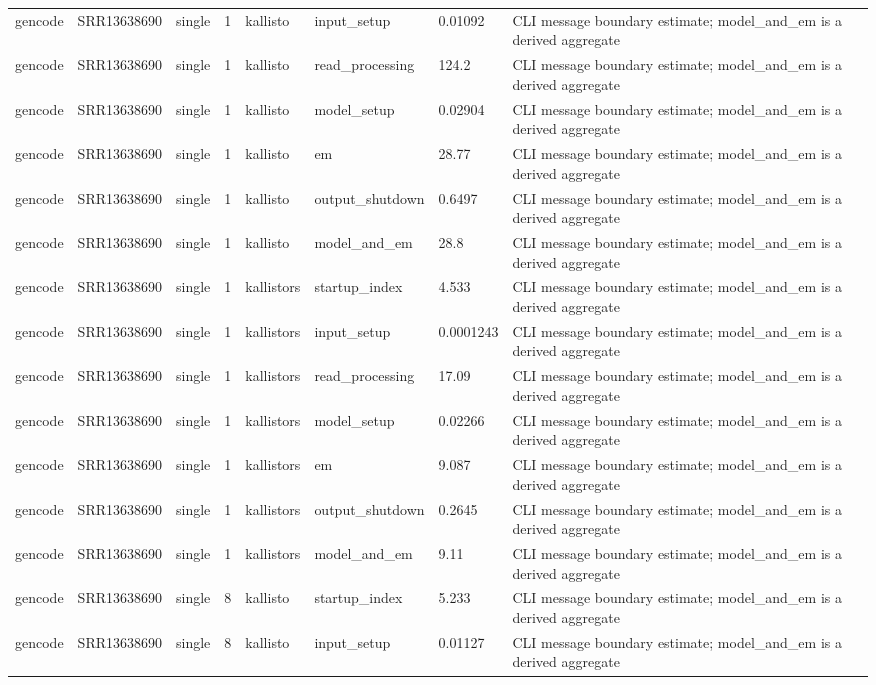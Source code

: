 \begin{tabular}{llllllll}
gencode & SRR13638690 & single & 1 & kallisto & input\_setup & 0.01092 & CLI message boundary estimate; model\_and\_em is a derived aggregate \\
gencode & SRR13638690 & single & 1 & kallisto & read\_processing & 124.2 & CLI message boundary estimate; model\_and\_em is a derived aggregate \\
gencode & SRR13638690 & single & 1 & kallisto & model\_setup & 0.02904 & CLI message boundary estimate; model\_and\_em is a derived aggregate \\
gencode & SRR13638690 & single & 1 & kallisto & em & 28.77 & CLI message boundary estimate; model\_and\_em is a derived aggregate \\
gencode & SRR13638690 & single & 1 & kallisto & output\_shutdown & 0.6497 & CLI message boundary estimate; model\_and\_em is a derived aggregate \\
gencode & SRR13638690 & single & 1 & kallisto & model\_and\_em & 28.8 & CLI message boundary estimate; model\_and\_em is a derived aggregate \\
gencode & SRR13638690 & single & 1 & kallistors & startup\_index & 4.533 & CLI message boundary estimate; model\_and\_em is a derived aggregate \\
gencode & SRR13638690 & single & 1 & kallistors & input\_setup & 0.0001243 & CLI message boundary estimate; model\_and\_em is a derived aggregate \\
gencode & SRR13638690 & single & 1 & kallistors & read\_processing & 17.09 & CLI message boundary estimate; model\_and\_em is a derived aggregate \\
gencode & SRR13638690 & single & 1 & kallistors & model\_setup & 0.02266 & CLI message boundary estimate; model\_and\_em is a derived aggregate \\
gencode & SRR13638690 & single & 1 & kallistors & em & 9.087 & CLI message boundary estimate; model\_and\_em is a derived aggregate \\
gencode & SRR13638690 & single & 1 & kallistors & output\_shutdown & 0.2645 & CLI message boundary estimate; model\_and\_em is a derived aggregate \\
gencode & SRR13638690 & single & 1 & kallistors & model\_and\_em & 9.11 & CLI message boundary estimate; model\_and\_em is a derived aggregate \\
gencode & SRR13638690 & single & 8 & kallisto & startup\_index & 5.233 & CLI message boundary estimate; model\_and\_em is a derived aggregate \\
gencode & SRR13638690 & single & 8 & kallisto & input\_setup & 0.01127 & CLI message boundary estimate; model\_and\_em is a derived aggregate \\

\end{tabular}
